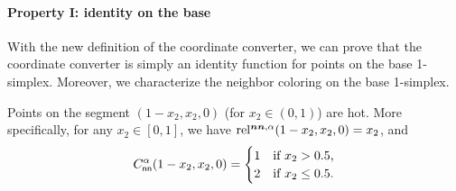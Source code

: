 \paragraph{Property I: identity on the base}
With the new definition of the coordinate converter, we can prove that the coordinate converter is simply an identity function for points on the base 1-simplex. 
Moreover, we characterize the neighbor coloring on the base 1-simplex.
\begin{lemma}
    \label{lem:new-converted-coordinates-on-base-1-simplex}
    Points on the segment $(1-x_2,x_2,0)$ (for $x_2\in (0,1)$) are hot. 
    More specifically, for any $x_2\in [0,1]$, we have $\operatorname*{rel^{\boldsymbol{nn},\alpha}}(1-x_2,x_2,0)=x_2$, and
    \begin{align*}
        C_{\sf nn}^{\alpha}(1-x_2,x_2,0)=\begin{cases}
            1 & \text{if $x_2> 0.5$,}\\
            2 & \text{if $x_2\leq 0.5$.}
        \end{cases}
    \end{align*}
\end{lemma}
